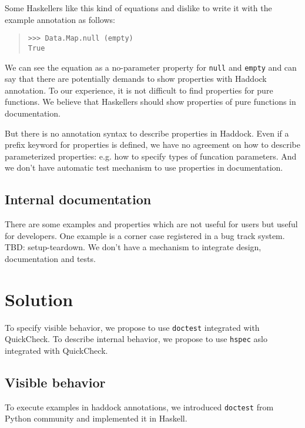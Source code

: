 \documentclass[preprint]{sigplanconf}
\begin{document}
\noindent Some Haskellers like this kind of equations and dislike to write it with the example annotation as follows:

\begin{quote}
\begin{verbatim}
>>> Data.Map.null (empty)
True
\end{verbatim}
\end{quote}

We can see the equation as a no-parameter property for {\tt null} and {\tt empty} and
can say that there are potentially demands to show properties with Haddock annotation.
To our experience, it is not difficult to find properties for pure functions.
We believe that Haskellers should show properties of pure functions
in documentation.

But there is no annotation syntax to describe properties in Haddock.
Even if a prefix keyword for properties is defined, 
we have no agreement on how to describe parameterized properties: e.g. how to specify types of funcation parameters. And we don't have automatic test mechanism to use properties in documentation.

\subsection{Internal documentation}

There are some examples and properties which are not useful for users but useful for developers. One example is a corner case registered in a bug track system. TBD: setup-teardown. We don't have a mechanism to integrate design, documentation and tests.

\section{Solution}

To specify visible behavior, we propose to use {\tt doctest} integrated with QuickCheck. To describe internal behavior, we propose to use {\tt hspec} aslo integrated with QuickCheck.

\subsection{Visible behavior}

To execute examples in haddock annotations, we introduced {\tt doctest} from Python community and implemented it in Haskell.
\end{document}

